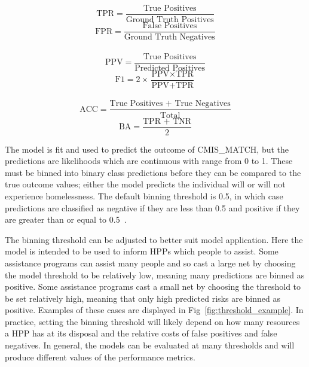 \documentclass[10pt,letterpaper]{article}
\begin{document}
\begin{multicols}{2}
    \centering
    \begin{equation}
        \text{TPR} = \frac{\text{True Positives}}{\text{Ground Truth Positives}}
        \label{eq:tpr}
    \end{equation}\break
    \begin{equation}
        \text{FPR} = \frac{\text{False Positives}}{\text{Ground Truth Negatives}}
        \label{eq:fpr}
    \end{equation}
    \\
    \begin{equation}
        \text{PPV} = \frac{\text{True Positives}}{\text{Predicted Positives}}
        \label{eq:ppv}
    \end{equation}\break
    \begin{equation}
        \text{F1} = 2\times\frac{\text{PPV}\times\text{TPR}}{\text{PPV} + \text{TPR}}
        \label{eq:f1}
    \end{equation}
    \\
    \begin{equation}
        \text{ACC} = \frac{\text{True Positives + True Negatives}}{\text{Total}}
        \label{eq:acc}
    \end{equation}\break
    \begin{equation}
        \text{BA} = \frac{\text{TPR + TNR}}{2}
        \label{eq:ba}
    \end{equation}
\end{multicols}

The model is fit and used to predict the outcome of CMIS\_MATCH, but the predictions are likelihoods which are continuous with range from 0 to 1. These must be binned into binary class predictions before they can be compared to the true outcome values; either the model predicts the individual will or will not experience homelessness. The default binning threshold is 0.5, in which case predictions are classified as negative if they are less than 0.5 and positive if they are greater than or equal to 0.5~\cite{bewick2005statistics}. 

The binning threshold can be adjusted to better suit model application. Here the model is intended to be used to inform HPPs which people to assist. Some assistance programs can assist many people and so cast a large net by choosing the model threshold to be relatively low, meaning many predictions are binned as positive. Some assistance programs cast a small net by choosing the threshold to be set relatively high, meaning that only high predicted risks are binned as positive. Examples of these cases are displayed in Fig~\ref{fig:threshold_example}. In practice, setting the binning threshold will likely depend on how many resources a HPP has at its disposal and the relative costs of false positives and false negatives. In general, the models can be evaluated at many thresholds and will produce different values of the performance metrics. 
\end{document}
